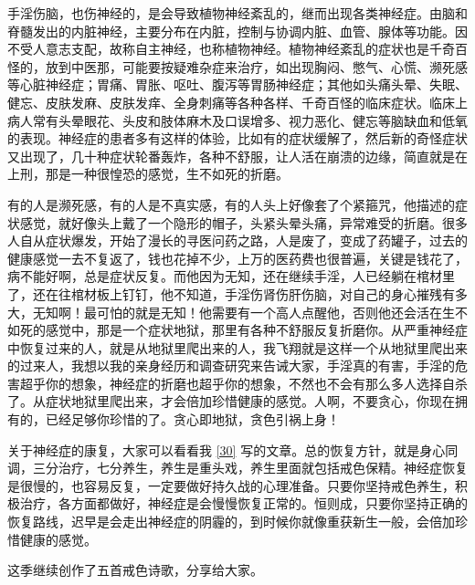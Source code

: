 手淫伤脑，也伤神经的，是会导致植物神经紊乱的，继而出现各类神经症。由脑和脊髓发出的内脏神经，主要分布在内脏，控制与协调内脏、血管、腺体等功能。因不受人意志支配，故称自主神经，也称植物神经。植物神经紊乱的症状也是千奇百怪的，放到中医那，可能要按疑难杂症来治疗，如出现胸闷、憋气、心慌、濒死感等心脏神经症；胃痛、胃胀、呕吐、腹泻等胃肠神经症；其他如头痛头晕、失眠、健忘、皮肤发麻、皮肤发痒、全身刺痛等各种各样、千奇百怪的临床症状。临床上病人常有头晕眼花、头皮和肢体麻木及口误增多、视力恶化、健忘等脑缺血和低氧的表现。神经症的患者多有这样的体验，比如有的症状缓解了，然后新的奇怪症状又出现了，几十种症状轮番轰炸，各种不舒服，让人活在崩溃的边缘，简直就是在上刑，那是一种很惶恐的感觉，生不如死的折磨。

有的人是濒死感，有的人是不真实感，有的人头上好像套了个紧箍咒，他描述的症状感觉，就好像头上戴了一个隐形的帽子，头紧头晕头痛，异常难受的折磨。很多人自从症状爆发，开始了漫长的寻医问药之路，人是废了，变成了药罐子，过去的健康感觉一去不复返了，钱也花掉不少，上万的医药费也很普遍，关键是钱花了，病不能好啊，总是症状反复。而他因为无知，还在继续手淫，人已经躺在棺材里了，还在往棺材板上钉钉，他不知道，手淫伤肾伤肝伤脑，对自己的身心摧残有多大，无知啊！最可怕的就是无知！他需要有一个高人点醒他，否则他还会活在生不如死的感觉中，那是一个症状地狱，那里有各种不舒服反复折磨你。从严重神经症中恢复过来的人，就是从地狱里爬出来的人，我飞翔就是这样一个从地狱里爬出来的过来人，我想以我的亲身经历和调查研究来告诫大家，手淫真的有害，手淫的危害超乎你的想象，神经症的折磨也超乎你的想象，不然也不会有那么多人选择自杀了。从症状地狱里爬出来，才会倍加珍惜健康的感觉。人啊，不要贪心，你现在拥有的，已经足够你珍惜的了。贪心即地狱，贪色引祸上身！

关于神经症的康复，大家可以看看我 \ref{30} 写的文章。总的恢复方针，就是身心同调，三分治疗，七分养生，养生是重头戏，养生里面就包括戒色保精。神经症恢复是很慢的，也容易反复，一定要做好持久战的心理准备。只要你坚持戒色养生，积极治疗，各方面都做好，神经症是会慢慢恢复正常的。恒则成，只要你坚持正确的恢复路线，迟早是会走出神经症的阴霾的，到时候你就像重获新生一般，会倍加珍惜健康的感觉。

这季继续创作了五首戒色诗歌，分享给大家。

